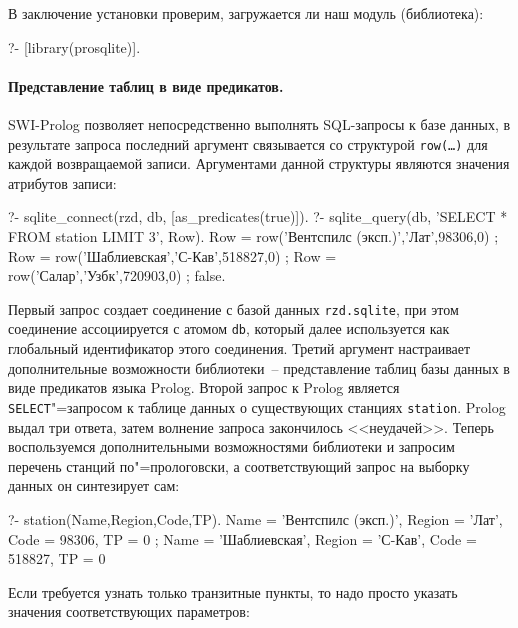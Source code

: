 \documentclass[a4paper,14pt, openany, twoside, draft]{extbook} %
\begin{document}
В заключение установки проверим, загружается ли наш модуль (библиотека):

\begin{proexp}
?- [library(prosqlite)].
\end{proexp}

\paragraph{Представление таблиц в виде предикатов.}  SWI-Prolog позволяет непосредственно выполнять SQL-запросы к базе данных, в результате запроса последний аргумент связывается со структурой \texttt{row(\ldots)} для каждой возвращаемой записи.  Аргументами данной структуры являются значения атрибутов записи:

\begin{proexp}
?- sqlite_connect(rzd, db, [as_predicates(true)]).
?- sqlite_query(db,
        'SELECT * FROM station LIMIT 3', Row).
Row = row('Вентспилс (эксп.)','Лат',98306,0) ;
Row = row('Шаблиевская','С-Кав',518827,0) ;
Row = row('Салар','Узбк',720903,0) ;
false.
\end{proexp}

\noindent{}Первый запрос создает соединение с базой данных \texttt{rzd.sqlite}, при этом соединение ассоциируется с атомом \texttt{db}, который далее используется как глобальный идентификатор этого соединения.  Третий аргумент настраивает дополнительные возможности библиотеки~--  представление таблиц базы данных в виде предикатов языка Prolog.  Второй запрос к Prolog является \foreignlanguage{english}{\texttt{SELECT}}"=запросом к таблице данных о существующих станциях \texttt{station}.  Prolog выдал три ответа, затем волнение запроса закончилось <<неудачей>>.  Теперь воспользуемся дополнительными возможностями библиотеки и запросим перечень станций по"=прологовски, а соответствующий запрос на выборку данных он синтезирует сам:

\begin{proexp}
?- station(Name,Region,Code,TP).
Name = 'Вентспилс (эксп.)',
Region = 'Лат',        %
Code = 98306,          %
TP = 0 ;               %
Name = 'Шаблиевская',  %
Region = 'С-Кав',
Code = 518827,
TP = 0
\end{proexp}


\noindent{}Если требуется узнать только транзитные пункты, то надо просто указать значения соответствующих параметров:
\end{document}
